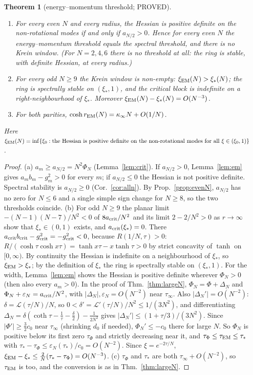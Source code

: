 \documentclass[11pt]{article}
\newtheorem{theorem}{Theorem}
\theoremstyle{remark}
\begin{document}
\begin{theorem}[energy--momentum threshold; PROVED]\label{thm:em}
\begin{enumerate}
\item[(a)] For every even $N$ and every radius, the Hessian is positive definite on the non-rotational modes if and only
if $a_{N/2}>0$. Hence for every even $N$ the energy--momentum threshold equals the spectral threshold, and there is no
Krein window. (For $N=2,4,6$ there is no threshold at all: the ring is stable, with definite Hessian, at every radius.)
\item[(b)] For every odd $N\ge9$ the Krein window is non-empty: $\xi_{\rm EM}(N)>\xi_*(N)$; the ring is spectrally
stable on $(\xi_*,1)$, and the critical block is indefinite on a right-neighbourhood of $\xi_*$. Moreover
$\xi_{\rm EM}(N)-\xi_*(N)=O(N^{-3})$.
\item[(c)] For both parities, $\cosh r_{\rm EM}(N)=\kappa_\infty N+O(1/N)$.
\end{enumerate}
Here $\xi_{\rm EM}(N)=\inf\{\xi_0:\text{the Hessian is positive definite on the non-rotational modes for all }\xi\in(\xi_0,1)\}$.
\end{theorem}
\begin{proof}
(a) $a_m\ge a_{N/2}=N^2\Phi_N$ (Lemma~\ref{lem:crit}). If $a_{N/2}>0$, Lemma~\ref{lem:em} gives $a_mb_m-g_m^2>0$ for every $m$; if
$a_{N/2}\le0$ the Hessian is not positive definite. Spectral stability is $a_{N/2}\ge0$ (Cor.~\ref{cor:alln}). By
Prop.~\ref{prop:evenN}, $a_{N/2}$ has no zero for $N\le6$ and a single simple sign change for $N\ge8$, so the two thresholds
coincide.
(b) For odd $N\ge9$ the planar limit $-(N-1)(N-7)/N^2<0$ of $8a_{\rm crit}/N^2$ and its limit $2-2/N^2>0$ as $r\to\infty$ show
that $\xi_*\in(0,1)$ exists, and $a_{\rm crit}(\xi_*)=0$. There $a_{\rm crit}b_{\rm crit}-g_{\rm crit}^2=-g_{\rm crit}^2<0$,
because $R(1/N,\tau)>0$: $R/(\cosh\tau\cosh x\tau)=\tanh x\tau-x\tanh\tau>0$ by strict concavity of $\tanh$ on
$[0,\infty)$. By continuity the Hessian is indefinite on a neighbourhood of $\xi_*$, so $\xi_{\rm EM}>\xi_*$; by the definition
of $\xi_*$ the ring is spectrally stable on $(\xi_*,1)$. For the width, Lemma~\ref{lem:em} shows the Hessian is positive
definite wherever $\Phi_N>0$ (then also every $a_m>0$). In the proof of Thm.~\ref{thm:largeN},
$\Phi_N=\Phi+\Delta_N$ and $\Phi_N+\varepsilon_N=a_{\rm crit}/N^2$, with $|\Delta_N|,\varepsilon_N=O(N^{-2})$ near $\tau_\infty$. Also
$|\Delta_N'|=O(N^{-2})$: $\delta=\mathcal L(\tau/N)/N$, so $0<\delta'=\mathcal L'(\tau/N)/N^2\le1/(3N^2)$, and differentiating
$\Delta_N=\delta(\coth\tau-\frac1\tau-\frac\delta2)-\frac1{2N^2}$ gives $|\Delta_N'|\le(1+\tau/3)/(3N^2)$. Since $|\Phi'|\ge\frac32c_0$ near
$\tau_\infty$ (shrinking $d_0$ if needed), $\Phi_N'\le-c_0$ there for large $N$. So $\Phi_N$ is positive below its first zero
$\tau_\Phi$ and strictly decreasing near it, and
$\tau_\Phi\le\tau_{\rm EM}\le\tau_*$ with $\tau_*-\tau_\Phi\le\varepsilon_N(\tau_*)/c_0=O(N^{-2})$. Since
$\xi=e^{-2\tau/N}$, $\xi_{\rm EM}-\xi_*\le\frac2N(\tau_*-\tau_\Phi)=O(N^{-3})$.
(c) $\tau_\Phi$ and $\tau_*$ are both $\tau_\infty+O(N^{-2})$, so $\tau_{\rm EM}$ is too, and the conversion is as in
Thm.~\ref{thm:largeN}.
\end{proof}
\end{document}
